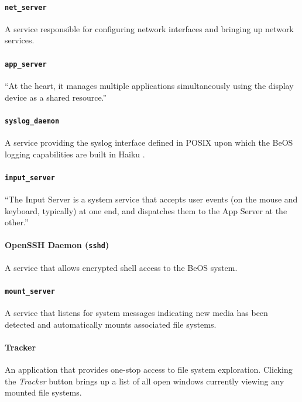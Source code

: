 \documentclass{article}
\begin{document}
\paragraph{\texttt{net\_server}}
A service responsible for configuring network interfaces and bringing
up network services. \cite{NetServerSource}

\paragraph{\texttt{app\_server}}
``At the heart, it manages multiple applications simultaneously using
the display device as a shared resource.''\cite{AppServer}

\paragraph{\texttt{syslog\_daemon}}
A service providing the syslog interface defined in POSIX upon which
the BeOS logging capabilities are built in Haiku \cite{SyslogInfo}.

\paragraph{\texttt{input\_server}}
``The Input Server is a system service that accepts user events (on
the mouse and keyboard, typically) at one end, and dispatches them to
the App Server at the other.''\cite{BeBookInputServer}

\paragraph{OpenSSH Daemon (\texttt{sshd})}
A service that allows encrypted shell access to the BeOS
system. \cite{OpenSSH}

\paragraph{\texttt{mount\_server}}
A service that listens for system messages indicating new media has
been detected and automatically mounts associated
file systems.\cite{AutoMounter}

\paragraph{Tracker}
An application that provides one-stop access to file system
exploration. Clicking the \textit{Tracker} button brings up a list of
all open windows currently viewing any mounted file
systems.\cite{Tracker}
\end{document}
